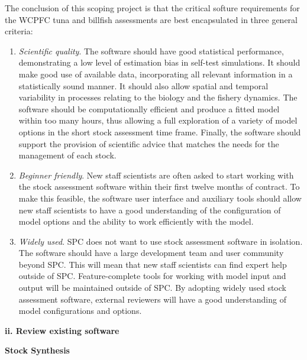 \documentclass{SCreport}
\begin{document}
The conclusion of this scoping project is that the critical softure requirements
for the WCPFC tuna and billfish assessments are best encapsulated in three
general criteria:\\[-4ex]

\begin{enumerate}
  \item \textit{Scientific quality}. The software should have good statistical
  performance, demonstrating a low level of estimation bias in self-test
  simulations. It should make good use of available data, incorporating all
  relevant information in a statistically sound manner. It should also allow
  spatial and temporal variability in processes relating to the biology and the
  fishery dynamics. The software should be computationally efficient and produce
  a fitted model within too many hours, thus allowing a full exploration of a
  variety of model options in the short stock assessment time frame. Finally,
  the software should support the provision of scientific advice that matches
  the needs for the management of each stock.
  \item \textit{Beginner friendly}. New staff scientists are often asked to
  start working with the stock assessment software within their first twelve
  months of contract. To make this feasible, the software user interface and
  auxiliary tools should allow new staff scientists to have a good understanding
  of the configuration of model options and the ability to work efficiently with
  the model.
  \item \textit{Widely used}. SPC does not want to use stock assessment software
  in isolation. The software should have a large development team and user
  community beyond SPC. This will mean that new staff scientists can find expert
  help outside of SPC. Feature-complete tools for working with model input and
  output will be maintained outside of SPC. By adopting widely used stock
  assessment software, external reviewers will have a good understanding of
  model configurations and options.
\end{enumerate}

\vspace{1ex}

\textbf{ii. Review existing software}

\textbf{Stock Synthesis}

\vspace{-1ex}
\end{document}
